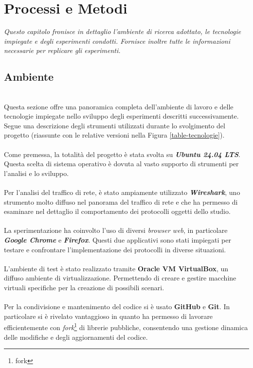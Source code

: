\chapter{Processi e Metodi}
\label{cap:processi-metodologie}

\textit{\indent Questo capitolo fronisce in dettaglio l'ambiente di ricerca adottato, le tecnologie impiegate e degli esperimenti condotti. 
Fornisce inoltre tutte le informazioni necessarie per replicare gli esperimenti.}

\section{Ambiente}
~\\
\indent Questa sezione offre una panoramica completa dell'ambiente di lavoro e delle tecnologie impiegate nello sviluppo degli esperimenti descritti successivamente. 
Segue una descrizione degli strumenti utilizzati durante lo svolgimento del progetto (riassunte con le relative versioni nella Figura \ref{table-tecnologie}).
\\\\
Come premessa, la totalità del progetto è stata svolta su \textbf{\emph{Ubuntu 24.04 LTS}}. 
Questa scelta di sistema operativo è dovuta al vasto supporto di strumenti per l'analisi e lo sviluppo.
\\\\
Per l'analisi del traffico di rete, è stato ampiamente utilizzato \textbf{\emph{Wireshark}}, 
uno strumento molto diffuso nel panorama del traffico di rete e che ha permesso di esaminare nel dettaglio il comportamento dei protocolli oggetti dello studio.
\\\\
La sperimentazione ha coinvolto l'uso di diversi \emph{browser web}, in particolare \textbf{\emph{Google Chrome}} e \textbf{\emph{Firefox}}. 
Questi due applicativi sono stati impiegati per testare e confrontare l'implementazione dei protocolli in diverse situazioni.
\\\\
L'ambiente di test è stato realizzato tramite \textbf{Oracle VM VirtualBox}, un diffuso ambiente di virtualizzazione. 
Permettendo di creare e gestire macchine virtuali specifiche per la creazione di possibili scenari.
\\\\
Per la condivisione e mantenimento del codice si è usato \textbf{GitHub} e \textbf{Git}.
In particolare si è rivelato vantaggioso in quanto ha permesso di lavorare efficientemente con \emph{fork}\footnote{\gls{fork}} di librerie pubbliche, consentendo una gestione dinamica delle modifiche e degli aggiornamenti del codice.


